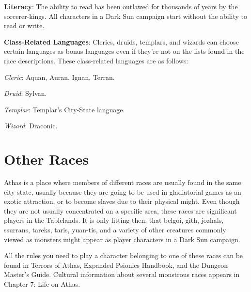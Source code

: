 \textbf{Literacy}: The ability to read has been outlawed for thousands of years by the sorcerer-kings. All characters in a Dark Sun campaign start without the ability to read or write.

\textbf{Class-Related Languages}: Clerics, druids, templars, and wizards can choose certain languages as bonus languages even if they're not on the lists found in the race descriptions. These class-related languages are as follows:

\textit{Cleric}: Aquan, Auran, Ignan, Terran.

\textit{Druid}: Sylvan.

\textit{Templar}: Templar's City-State language.

\textit{Wizard}: Draconic.












\section{Other Races}
Athas is a place where members of different races are usually found in the same city-state, usually because they are going to be used in gladiatorial games as an exotic attraction, or to become slaves due to their physical might. Even though they are not usually concentrated on a specific area, these races are significant players in the Tablelands. It is only fitting then, that belgoi, gith, jozhals, ssurrans, tareks, taris, yuan-tis, and a variety of other creatures commonly viewed as monsters might appear as player characters in a Dark Sun campaign.

All the rules you need to play a character belonging to one of these races can be found in Terrors of Athas, Expanded Psionics Handbook, and the Dungeon Master's Guide. Cultural information about several monstrous races appears in Chapter 7: Life on Athas.


